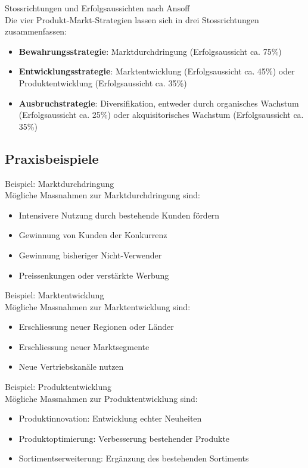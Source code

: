 \begin{concept}{Stossrichtungen und Erfolgsaussichten nach Ansoff}\\
Die vier Produkt-Markt-Strategien lassen sich in drei Stossrichtungen zusammenfassen:
\begin{itemize}
    \item \textbf{Bewahrungsstrategie}: Marktdurchdringung (Erfolgsaussicht ca. 75\%)
    \item \textbf{Entwicklungsstrategie}: Marktentwicklung (Erfolgsaussicht ca. 45\%) oder Produktentwicklung (Erfolgsaussicht ca. 35\%)
    \item \textbf{Ausbruchstrategie}: Diversifikation, entweder durch organisches Wachstum (Erfolgsaussicht ca. 25\%) oder akquisitorisches Wachstum (Erfolgsaussicht ca. 35\%)
\end{itemize}
\end{concept}

\subsection{Praxisbeispiele}

\begin{example2}{Beispiel: Marktdurchdringung}\\
Mögliche Massnahmen zur Marktdurchdringung sind:
\begin{itemize}
    \item Intensivere Nutzung durch bestehende Kunden fördern
    \item Gewinnung von Kunden der Konkurrenz
    \item Gewinnung bisheriger Nicht-Verwender
    \item Preissenkungen oder verstärkte Werbung
\end{itemize}
\end{example2}

\begin{example2}{Beispiel: Marktentwicklung}\\
Mögliche Massnahmen zur Marktentwicklung sind:
\begin{itemize}
    \item Erschliessung neuer Regionen oder Länder
    \item Erschliessung neuer Marktsegmente
    \item Neue Vertriebskanäle nutzen
\end{itemize}
\end{example2}

\begin{example2}{Beispiel: Produktentwicklung}\\
Mögliche Massnahmen zur Produktentwicklung sind:
\begin{itemize}
    \item Produktinnovation: Entwicklung echter Neuheiten
    \item Produktoptimierung: Verbesserung bestehender Produkte
    \item Sortimentserweiterung: Ergänzung des bestehenden Sortiments
\end{itemize}
\end{example2}

